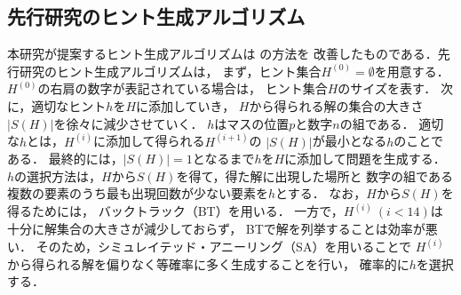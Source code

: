\documentclass[a4paper, 9pt]{jarticle}
\begin{document}
\begin{論文概要}
\section{先行研究のヒント生成アルゴリズム}
本研究が提案するヒント生成アルゴリズムは \cite{previous_research} の方法を
改善したものである．先行研究のヒント生成アルゴリズムは，
まず，ヒント集合$H^{(0)} = \emptyset$を用意する．
$H^{(0)}$の右肩の数字が表記されている場合は，
ヒント集合$H$のサイズを表す．
次に，適切なヒント$h$を$H$に添加していき，
$H$から得られる解の集合の大きさ$|S(H)|$を徐々に減少させていく．
$h$はマスの位置$p$と数字$n$の組である．
適切な$h$とは，$H^{(i)}$に添加して得られる$H^{(i+1)}$の
$|S(H)|$が最小となる$h$のことである．
最終的には，$|S(H)| = 1$となるまで$h$を$H$に添加して問題を生成する．
$h$の選択方法は，$H$から$S(H)$を得て，得た解に出現した場所と
数字の組である複数の要素のうち最も出現回数が少ない要素を$h$とする．
なお，$H$から$S(H)$を得るためには，
バックトラック（BT）を用いる．
一方で，$H^{(i)} ~ (i < 14)$は十分に解集合の大きさが減少しておらず，
BTで解を列挙することは効率が悪い．
そのため，シミュレイテッド・アニーリング（SA）を用いることで
$H^{(i)}$から得られる解を偏りなく等確率に多く生成することを行い，
確率的に$h$を選択する．


\end{論文概要}
\end{document}
